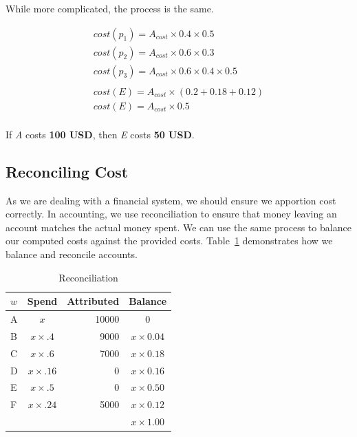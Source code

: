\documentclass[10pt, a4paper, twocolumn]{article}
\begin{document}
      While more complicated, the process is the same.

      \begin{gather*}
        cost(p_{1}) = A_{cost} \times 0.4 \times 0.5 \\
        cost(p_{2}) = A_{cost} \times 0.6 \times 0.3 \\
        cost(p_{3}) = A_{cost} \times 0.6 \times 0.4 \times 0.5 \\
        \\
        cost(E) = A_{cost} \times (0.2 + 0.18 + 0.12) \\
        cost(E) = A_{cost} \times 0.5 \\
      \end{gather*}

      If \textit{A} costs \textbf{100 USD}, then \textit{E} costs \textbf{50 USD}.

  \subsection*{Reconciling Cost}
    As we are dealing with a financial system, we should ensure we apportion cost correctly.
    In accounting, we use reconciliation to ensure that money leaving an account matches the actual money spent.
    We can use the same process to balance our computed costs against the provided costs.
    Table~\ref{table:1} demonstrates how we balance and reconcile accounts.

    \begin{table}[H]
      \centering
      \begin{tabular}{ l|c|r|c }
        $w$ & Spend            & Attributed & Balance           \\
        \hline
        A   & $ x            $ &      10000 & $ 0             $ \\
        B   & $ x \times .4  $ &       9000 & $ x \times 0.04 $ \\
        C   & $ x \times .6  $ &       7000 & $ x \times 0.18 $ \\
        D   & $ x \times .16 $ &          0 & $ x \times 0.16 $ \\
        E   & $ x \times .5  $ &          0 & $ x \times 0.50 $ \\
        F   & $ x \times .24 $ &       5000 & $ x \times 0.12 $ \\
        \hline
            &                  &            & $ x \times 1.00 $ \\
      \end{tabular}
      \caption{Reconciliation}
      \label{table:1}
    \end{table}
\end{document}
